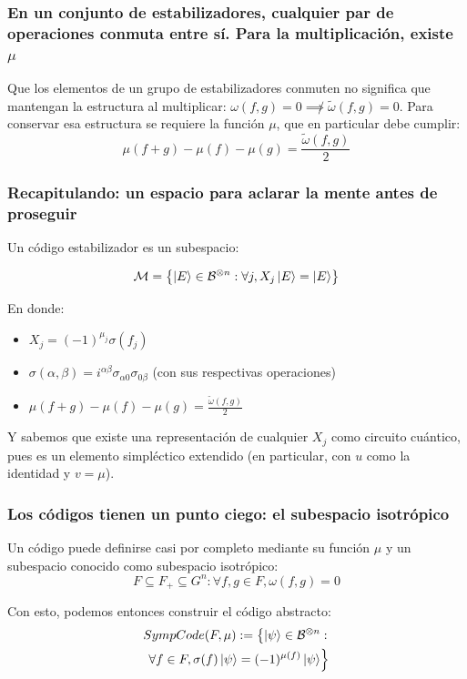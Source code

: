 \documentclass[english,9pt]{Linnaeus}
\begin{document}
\begin{frame}
  \frametitle{En un conjunto de estabilizadores, cualquier par de operaciones conmuta entre sí. Para la multiplicación, existe $\mu$}

  Que los elementos de un grupo de estabilizadores conmuten no significa que mantengan la estructura al multiplicar: $\omega(f, g) = 0 \not\implies \tilde{\omega}(f, g) = 0$. Para conservar esa estructura se requiere la función $\mu$, que en particular debe cumplir:
  \begin{equation}
    \mu(f + g) - \mu(f) - \mu(g) = \frac{\tilde{\omega}(f, g)}{2}
    \label{eq:mu_correction}
  \end{equation}
\end{frame}

\begin{frame}
  \frametitle{Recapitulando: un espacio para aclarar la mente antes de proseguir}

  Un código estabilizador es un subespacio:

  \begin{equation}
    \mathcal{M} = \left\{ \ket{E} \in \mathcal{B}^{\otimes n} : \forall j, X_j \ket{E} = \ket{E}\right\}
    \label{eq:stabilizers_recap}
  \end{equation}

  En donde:
  \begin{itemize}
    \item $X_j = (-1)^{\mu_j} \sigma(f_j)$
    \item $\sigma(\alpha, \beta) = i^{\alpha\beta} \sigma_{\alpha 0}\sigma_{0 \beta}$ (con sus respectivas operaciones)
    \item $\mu(f + g) - \mu(f) - \mu(g) = \frac{\tilde{\omega}(f, g)}{2}$
  \end{itemize}

  Y sabemos que existe una representación de cualquier $X_j$ como circuito cuántico, pues es un elemento simpléctico extendido (en particular, con $u$ como la identidad y $v = \mu$).
\end{frame}

\begin{frame}
  \frametitle{Los códigos tienen un punto ciego: el subespacio isotrópico}
  Un código puede definirse casi por completo mediante su función $\mu$ y un subespacio conocido como subespacio isotrópico:
  \begin{equation}
    F \subseteq F_+ \subseteq G^n : \forall f, g \in F, \omega(f, g) = 0
    \label{eq:isotropic}
  \end{equation}

  Con esto, podemos entonces construir el código abstracto:
  \begin{equation}
    \begin{split}
    SympCode(F, \mu) := \left\{\ket{\psi} \in \mathcal{B}^{\otimes n} :\right.\\
      \left.\forall f \in F, \sigma(f) \ket{\psi} = (-1)^{\mu(f)}\ket{\psi}\right\}
    \end{split}
    \label{eq:simp_abst}
  \end{equation}

\end{frame}
\end{document}
